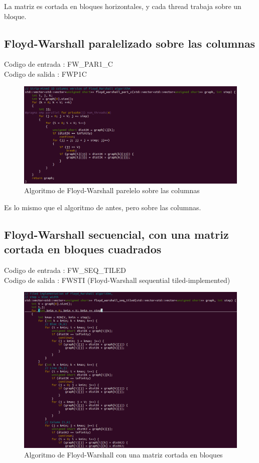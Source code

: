 \documentclass[a4paper,11pt]{article}
\begin{document}
La matriz es cortada en bloques horizontales, y cada thread trabaja sobre un bloque.

\subsection{Floyd-Warshall paralelizado sobre las columnas}

\noindent Codigo de entrada : FW\_PAR1\_C \\
Codigo de salida : FWP1C

\begin{figure}[H]
\begin{center}
  \includegraphics[scale=0.6]{FW_PAR1_C.png}
  \caption{Algoritmo de Floyd-Warshall parelelo sobre las columnas}
\end{center}
\end{figure}

Es lo mismo que el algoritmo de antes, pero sobre las columnas.

\subsection{Floyd-Warshall secuencial, con una matriz cortada en bloques cuadrados}

\noindent Codigo de entrada : FW\_SEQ\_TILED \\
Codigo de salida : FWSTI (Floyd-Warshall sequential tiled-implemented)

\begin{figure}[H]
\begin{center}
  \includegraphics[scale=0.6]{FW_SEQ_TILED.png}
  \caption{Algoritmo de Floyd-Warshall con una matriz cortada en bloques}
\end{center}
\end{figure}
\end{document}
